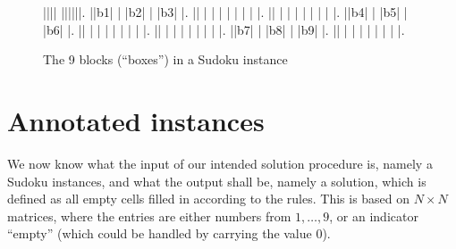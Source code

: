 \documentclass[11pt]{report}
\begin{document}
\begin{figure}[htbp]
\begin{sudoku}
 |{}|{}|{}| {}|{}|{}|{}|{}|{}|.
 |{}|{\LARGE b1}| | |{\LARGE b2}| | |{\LARGE b3}| |.
 |{}| | | | | | | | |.
 |{}| | | | | | | | |.
 |{}|{\LARGE b4}| | |{\LARGE b5}| | |{\LARGE b6}| |.
 |{}| | | | | | | | |.
 |{}| | | | | | | | |.
 |{}|{\LARGE b7}| | |{\LARGE b8}| | |{\LARGE b9}| |.
 |{}| | | | | | | | |.
\end{sudoku}
\caption{The 9 blocks (``boxes'') in a Sudoku instance}
\label{fig:exampleblock}
\end{figure}



\section{Annotated instances}
\label{sec:Annotatedinstances}

We now know what the input of our intended solution procedure is, namely a Sudoku instances, and what the output shall be, namely a solution, which is defined as all empty cells filled in according to the rules. This is based on $N \times N$ matrices, where the entries are either numbers from $1,\dots,9$, or an indicator ``empty'' (which could be handled by carrying the value $0$).
\end{document}

